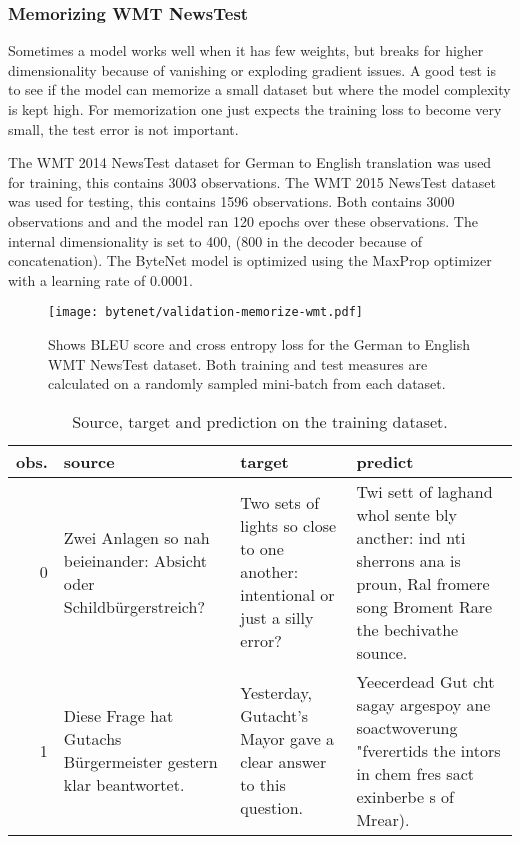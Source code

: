 \clearpage
\subsubsection{Memorizing WMT NewsTest}

Sometimes a model works well when it has few weights, but breaks for higher dimensionality because of vanishing or exploding gradient issues. A good test is to see if the model can memorize a small dataset but where the model complexity is kept high. For memorization one just expects the training loss to become very small, the test error is not important.

The WMT 2014 NewsTest dataset for German to English translation was used for training, this contains 3003 observations. The WMT 2015 NewsTest dataset was used for testing, this contains 1596 observations. Both contains 3000 observations and and the model ran 120 epochs over these observations. The internal dimensionality is set to 400, (800 in the decoder because of concatenation). The ByteNet model is optimized using the MaxProp optimizer with a learning rate of 0.0001.

\begin{figure}[h]
    \centering
    \texttt{[image: bytenet/validation-memorize-wmt.pdf]}
    \caption{Shows BLEU score and cross entropy loss for the German to English WMT NewsTest dataset. Both training and test measures are calculated on a randomly sampled mini-batch from each dataset.}
\end{figure}

\begin{table}[h]
\centering
\begin{tabular}{r|p{3.3cm} p{3.3cm} p{3.3cm}}
	obs. & source & target & predict\\ \hline
  0  & Zwei Anlagen so nah beieinander: Absicht oder Schildbürgerstreich? & Two sets of lights so close to one another: intentional or just a silly error? & Twi sett of laghand whol sente bly ancther: ind nti sherrons ana is proun, Ral fromere song Broment Rare the bechivathe sounce. \\
  1 & Diese Frage hat Gutachs Bürgermeister gestern klar beantwortet. & Yesterday, Gutacht's Mayor gave a clear answer to this question. & Yeecerdead Gut cht sagay argespoy ane soactwoverung "fverertids the intors in chem fres sact exinberbe s of Mrear).
\end{tabular}
\caption{Source, target and prediction on the training dataset.}
\end{table}

